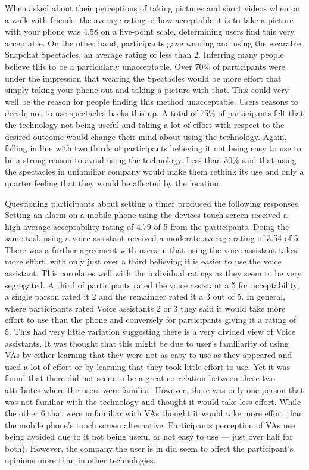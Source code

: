 \documentclass{l4proj}
\begin{document}
When asked about their perceptions of taking pictures and short videos when on a walk with friends, the average rating of how acceptable it is to take a picture with your phone was 4.58 on a five-point scale, determining users find this very acceptable. On the other hand, participants gave wearing and using the wearable, Snapchat Spectacles, an average rating of less than 2. Inferring many people believe this to be a particularly unacceptable. Over 70\% of participants were under the impression that wearing the Spectacles would be more effort that simply taking your phone out and taking a picture with that. This could very well be the reason for people finding this method unacceptable. Users reasons to decide not to use spectacles backs this up. A total of 75\% of participants felt that the technology not being useful and taking a lot of effort with respect to the desired outcome would change their mind about using the technology. Again, falling in line with two thirds of participants believing it not being easy to use to be a strong reason to avoid using the technology. Less than 30\% said that using the spectacles in unfamiliar company would make them rethink its use and only a quarter feeling that they would be affected by the location. 

Questioning participants about setting a timer produced the following responses. Setting an alarm on a mobile phone using the devices touch screen received a high average acceptability rating of 4.79 of 5 from the participants. Doing the same task using a voice assistant received a moderate average rating of 3.54 of 5. There was a further agreement with users in that using the voice assistant takes more effort, with only just over a third believing it is easier to use the voice assistant. This correlates well with the individual ratings as they seem to be very segregated. A third of participants rated the voice assistant a 5 for acceptability, a single parson rated it 2 and the remainder rated it a 3 out of 5. In general, where participants rated Voice assistants 2 or 3 they said it would take more effort to use than the phone and conversely for participants giving it a rating of 5. This had very little variation suggesting there is a very divided view of Voice assistants. It was thought that this might be due to user’s familiarity of using VAs by either learning that they were not as easy to use as they appeared and used a lot of effort or by learning that they took little effort to use. Yet it was found that there did not seem to be a great correlation between these two attributes where the users were familiar. However, there was only one person that was not familiar with the technology and thought it would take less effort. While the other 6 that were unfamiliar with VAs thought it would take more effort than the mobile phone's touch screen alternative. Participants perception of VAs use being avoided due to it not being useful or not easy to use --- just over half for both). However, the company the user is in did seem to affect the participant's opinions more than in other technologies.
\end{document}

